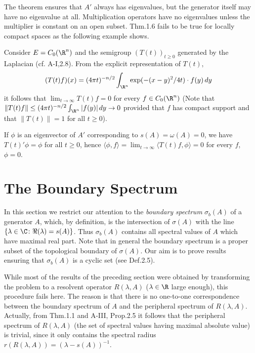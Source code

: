 The theorem ensures that $A'$ always has eigenvalues, but the generator itself may have no eigenvalue at all.
Multiplication operators have no eigenvalues unless the multiplier is constant on an open subset.
Thm.1.6 fails to be true for locally compact spaces as the following example shows.
\begin{example}\label{ex:b3-1.7}
	Consider $E = C_{0}(\R^{n})$ and the semigroup $(T(t))_{t \geq 0}$ generated by the Laplacian (cf. A-I,2.8).
From the explicit representation of $T(t)$,
	\begin{equation}\label{eq:b3-1.17}
		(T(t)f)(x) = (4\pi t)^{-n/2}\int_{\R^{n}} \exp(-(x-y)^{2}/4t)\cdot f(y) \, dy
	\end{equation}
	it follows that $\lim_{t \to \infty}T(t)f = 0$ for every $f \in C_{0}(\R^{n})$ (Note that $\|T(t)f\| \leq (4\pi t)^{-n/2}\int_{\R^{n}} |f(y)|\,dy \to 0$ provided that $f$ has compact support and that $\|T(t)\| = 1$ for all $t \geq 0$).
	
	If $\phi$ is an eigenvector of $A'$ corresponding to $s(A) = \omega(A) = 0$, we have $T(t)'\phi = \phi$ for all $t \geq 0$, hence $\langle \phi,f \rangle = \lim_{t \to \infty}\langle T(t)f,\phi \rangle = 0$ for every $f$, \ie $\phi = 0$.
\end{example}
%
%		
\section{The Boundary Spectrum}\label{sec:b3-2}
In this section we restrict our attention to the \emph{boundary spectrum} $\sigma_{b}(A)$ of a generator $A$, which, by definition, is the intersection of $\sigma(A)$ with the line $\{\lambda \in \C \colon \Re(\lambda) = s(A)\}$.
Thus $\sigma_{b}(A)$ contains all spectral values of $A$ which have maximal real part.
Note that in general the boundary spectrum is a proper subset of the topological boundary of $\sigma(A)$.
Our aim is to prove results ensuring that $\sigma_{b}(A)$ is a cyclic set (see Def.2.5).

While most of the results of the preceding section were obtained by transforming the problem to a resolvent operator $R(\lambda,A)$ ($\lambda \in \R$ large enough), this procedure fails here.
The reason is that there is no one-to-one correspondence between the boundary spectrum of $A$ and the peripheral spectrum of $R(\lambda,A)$.
Actually, from Thm.1.1 and A-III, Prop.2.5 it follows that the peripheral spectrum of $R(\lambda,A)$ (\ie the set of spectral values having maximal absolute value) is trivial, since it only contains the spectral radius $r(R(\lambda,A)) = (\lambda - s(A))^{-1}$.

